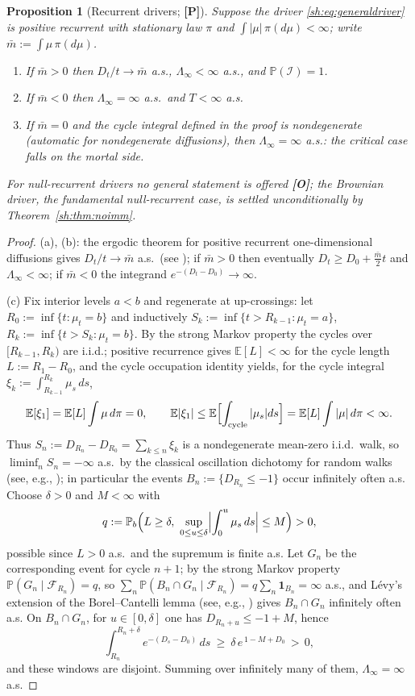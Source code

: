 \documentclass[11pt]{article}
\numberwithin{equation}{section}
\theoremstyle{plain}
\newtheorem{proposition}[theorem]{Proposition}
\theoremstyle{definition}
\theoremstyle{remark}
\newcommand{\E}{\mathbb{E}}
\newcommand{\PP}{\mathbb{P}}
\newcommand{\one}{\mathbf{1}}
\newcommand{\Imm}{\mathcal{I}}
\newcommand{\Fc}{\mathcal{F}}
\begin{document}
\begin{proposition}[Recurrent drivers; \textbf{[P]}]\label{sh:prop:recurrent}
Suppose the driver \eqref{sh:eq:generaldriver} is positive recurrent with
stationary law $\pi$ and $\int|\mu|\,\pi(d\mu)<\infty$; write
$\bar m:=\int\mu\,\pi(d\mu)$.
\begin{enumerate}[label=\emph{(\alph*)},itemsep=1pt]
\item If $\bar m>0$ then $D_t/t\to\bar m$ a.s., $\Lambda_\infty<\infty$
a.s., and $\PP(\Imm)=1$.
\item If $\bar m<0$ then $\Lambda_\infty=\infty$ a.s.\ and $T<\infty$ a.s.
\item If $\bar m=0$ and the cycle integral defined in the proof is
nondegenerate (automatic for nondegenerate diffusions), then
$\Lambda_\infty=\infty$ a.s.: \emph{the critical case falls on the mortal
side.}
\end{enumerate}
For null-recurrent drivers no general statement is offered
\textbf{[O]}; the Brownian driver, the fundamental null-recurrent case, is
settled unconditionally by Theorem~\ref{sh:thm:noimm}.
\end{proposition}

\begin{proof}
(a), (b): the ergodic theorem for positive recurrent one-dimensional
diffusions gives $D_t/t\to\bar m$ a.s.\ (see \cite[Ch.~X]{RY99}); if
$\bar m>0$ then eventually $D_t\ge D_0+\tfrac{\bar m}2t$ and
$\Lambda_\infty<\infty$; if $\bar m<0$ the integrand
$e^{-(D_t-D_0)}\to\infty$.

(c) Fix interior levels $a<b$ and regenerate at up-crossings: let
$R_0:=\inf\{t:\mu_t=b\}$ and inductively
$S_k:=\inf\{t>R_{k-1}:\mu_t=a\}$, $R_k:=\inf\{t>S_k:\mu_t=b\}$. By the
strong Markov property the cycles over $[R_{k-1},R_k)$ are i.i.d.; positive
recurrence gives $\E[L]<\infty$ for the cycle length
$L:=R_1-R_0$, and the cycle occupation identity yields, for the cycle
integral $\xi_k:=\int_{R_{k-1}}^{R_k}\mu_s\,ds$,
\[
\E[\xi_1]=\E[L]\int\mu\,d\pi=0,\qquad
\E|\xi_1|\le\E\Bigl[\int_{\text{cycle}}|\mu_s|ds\Bigr]
=\E[L]\int|\mu|\,d\pi<\infty .
\]
Thus $S_n:=D_{R_n}-D_{R_0}=\sum_{k\le n}\xi_k$ is a nondegenerate mean-zero
i.i.d.\ walk, so $\liminf_nS_n=-\infty$ a.s.\ by the classical
oscillation dichotomy for random walks (see, e.g., \cite{Dur19});
in particular the events $B_n:=\{D_{R_n}\le-1\}$ occur infinitely often
a.s. Choose $\delta>0$ and $M<\infty$ with
\[
q:=\PP_b\Bigl(L\ge\delta,\ \sup_{0\le u\le\delta}
\Bigl|\int_0^u\mu_s\,ds\Bigr|\le M\Bigr)>0,
\]
possible since $L>0$ a.s.\ and the supremum is finite a.s. Let
$G_n$ be the corresponding event for cycle $n{+}1$; by the strong Markov
property $\PP(G_n\mid\Fc_{R_n})=q$, so
$\sum_n\PP(B_n\cap G_n\mid\Fc_{R_n})=q\sum_n\one_{B_n}=\infty$ a.s., and
L\'evy's extension of the Borel--Cantelli lemma (see, e.g.,
\cite{Dur19}) gives
$B_n\cap G_n$ infinitely often a.s. On $B_n\cap G_n$, for
$u\in[0,\delta]$ one has $D_{R_n+u}\le-1+M$, hence
\[
\int_{R_n}^{R_n+\delta}e^{-(D_s-D_0)}\,ds\ \ge\ \delta\,e^{\,1-M+D_0}\,>\,0 ,
\]
and these windows are disjoint. Summing over infinitely many of them,
$\Lambda_\infty=\infty$ a.s.
\end{proof}
\end{document}
